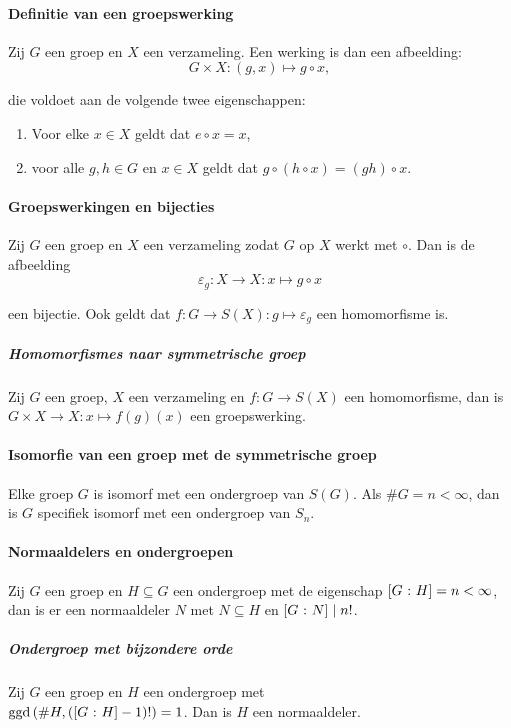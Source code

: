 \paragraph{Definitie van een groepswerking} Zij \(G\) een groep en \(X\) een verzameling. Een werking is dan een afbeelding:
\[
    G\times X\colon (g,x)\mapsto g\circ x,
\]

die voldoet aan de volgende twee eigenschappen:
\begin{enumerate}
    \item Voor elke \(x\in X\) geldt dat \(e\circ x=x\),
    \item voor alle \(g,h\in G\) en \(x\in X\) geldt dat \(g\circ(h\circ x)=(gh)\circ x\).
\end{enumerate}

\paragraph{Groepswerkingen en bijecties} Zij \(G\) een groep en \(X\) een verzameling zodat \(G\) op \(X\) werkt met \(\circ\). Dan is de afbeelding
\[
    \varepsilon_{g}\colon X\to X\colon x\mapsto g\circ x
\]

een bijectie. Ook geldt dat \(f\colon G\to S(X)\colon g\mapsto\varepsilon_{g}\) een homomorfisme is.

\subparagraph{Homomorfismes naar symmetrische groep} Zij \(G\) een groep, \(X\) een verzameling en \(f\colon G\to S(X)\) een homomorfisme, dan is \(G\times X\to X\colon x\mapsto f(g)(x)\) een groepswerking.

\paragraph{Isomorfie van een groep met de symmetrische groep} Elke groep \(G\) is isomorf met een ondergroep van \(S(G)\). Als \(\#G=n<\infty\), dan is \(G\) specifiek isomorf met een ondergroep van \(S_{n}\).

\paragraph{Normaaldelers en ondergroepen} Zij \(G\) een groep en \(H\subseteq G\) een ondergroep met de eigenschap \(\left[G\>\colon H\right]=n<\infty\), dan is er een normaaldeler \(N\) met \(N\subseteq H\) en \(\left[G\>\colon N\right]\mid n!\).

\subparagraph{Ondergroep met bijzondere orde} Zij \(G\) een groep en \(H\) een ondergroep met \\\(\operatorname{ggd}\left(\#H,\left(\left[G\>\colon H\right]-1\right)!\right)=1\). Dan is \(H\) een normaaldeler.


